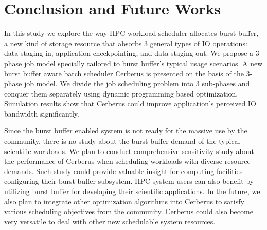 \section{Conclusion and Future Works}
\label{Sec:Conclusion}

In this study we explore the way HPC workload scheduler allocates burst buffer,
a new kind of storage resource that absorbs 3 general types of IO operations:
data staging in, application checkpointing, and data staging out.
We propose a 3-phase job model specially
tailored to burst buffer's typical usage scenarios.
A new burst buffer aware batch scheduler Cerberus is presented
on the basis of the 3-phase job model.
We divide the job scheduling problem into 3 sub-phases
and conquer them separately using dynamic programming based optimization.
Simulation results show that
Cerberus could improve application's perceived IO bandwidth significantly.


Since the burst buffer enabled system is not ready for the massive 
use by the community, 
there is no study about the burst buffer demand of the typical scientific workloads.
We plan to conduct comprehensive sensitivity study about the performance of Cerberus
when scheduling workloads with diverse resource demands. Such study could provide
valuable insight for computing facilities configuring their burst buffer subsystem.
HPC system users can also benefit by utilizing burst buffer for developing
their scientific applications.
In the future, we also plan to integrate other optimization algorithms into Cerberus
to satisfy various scheduling objectives from the community. 
Cerberus could also become very versatile 
to deal with other new schedulable system resources.

